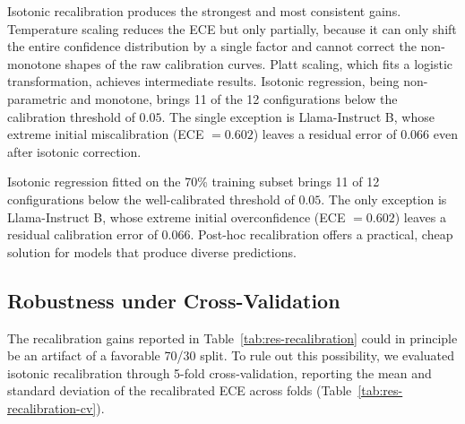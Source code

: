 Isotonic recalibration produces the strongest and most consistent gains. 
Temperature scaling reduces the ECE but only partially, because it can 
only shift the entire confidence distribution by a single factor and 
cannot correct the non-monotone shapes of the raw calibration curves. 
Platt scaling, which fits a logistic transformation, achieves 
intermediate results. Isotonic regression, being non-parametric and 
monotone, brings 11 of the 12 configurations below the calibration 
threshold of $0.05$. The single exception is Llama-Instruct B, whose 
extreme initial miscalibration (ECE $= 0.602$) leaves a residual error 
of $0.066$ even after isotonic correction.

\begin{finding}
    Isotonic regression fitted on the 70\% training subset brings 11 of 
    12 configurations below the well-calibrated threshold of $0.05$. 
    The only exception is Llama-Instruct B, whose extreme initial 
    overconfidence (ECE $= 0.602$) leaves a residual calibration error of 
    $0.066$. Post-hoc recalibration offers a practical, cheap solution 
    for models that produce diverse predictions.
\end{finding}

\subsection{Robustness under Cross-Validation}
\label{subsec:res-recalibration-cv}

The recalibration gains reported in 
Table~\ref{tab:res-recalibration} could in principle be an artifact of a 
favorable 70/30 split. To rule out this possibility, we evaluated 
isotonic recalibration through 5-fold cross-validation, reporting the 
mean and standard deviation of the recalibrated ECE across folds 
(Table~\ref{tab:res-recalibration-cv}).

